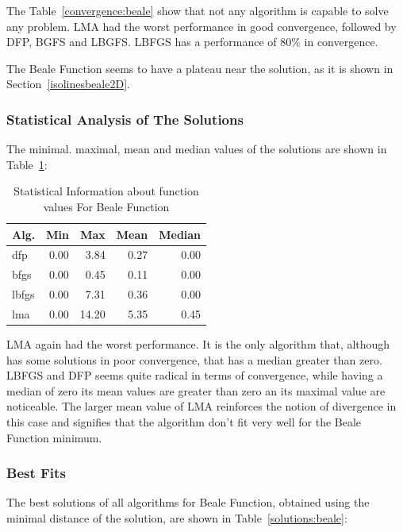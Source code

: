 \documentclass[conference]{IEEEtran}
\begin{document}
The Table~\ref{convergence:beale} show that not any algorithm
is capable to solve any problem. LMA had the worst performance
in good convergence, followed by DFP, BGFS and LBGFS. LBFGS has
a performance of 80\% in convergence.

The Beale Function seems to have a plateau near the solution, as
it is shown in Section~\ref{isolinesbeale2D}.

\subsubsection{Statistical Analysis of The Solutions}
\label{statisticalanalysisbeale2D}


The minimal. maximal, mean and median values of the solutions are shown in Table~\ref{function_values:beale}:

\begin{table}[H]
\centering
\caption{Statistical Information about function values For Beale Function}
\label{function_values:beale}
\begin{tabular}{lrrrr}
\toprule
 Alg. &  Min &   Max &  Mean &  Median \\
\midrule
  dfp & 0.00 &  3.84 &  0.27 &    0.00 \\
 bfgs & 0.00 &  0.45 &  0.11 &    0.00 \\
lbfgs & 0.00 &  7.31 &  0.36 &    0.00 \\
  lma & 0.00 & 14.20 &  5.35 &    0.45 \\
\bottomrule
\end{tabular}
\end{table}

LMA again had the worst performance. It is the only algorithm that, although has some solutions in
poor convergence, that has a median greater than zero. LBFGS and DFP seems quite radical in terms
of convergence, while having a median of zero its mean values are greater than zero an its maximal
value are noticeable. The larger mean value of LMA reinforces the notion of divergence in this case
and signifies that the algorithm don't fit very well for the Beale Function minimum.


\subsubsection{Best Fits}
\label{bestfitsbeale2D}


The best solutions of all algorithms for Beale Function, obtained using the minimal
distance of the solution, are shown in Table~\ref{solutions:beale}:
\end{document}
